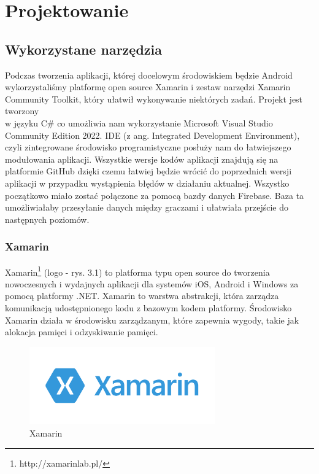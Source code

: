 	\newpage
\section{Projektowanie}		%

\subsection{Wykorzystane narzędzia}

\hspace*{0.60cm}Podczas tworzenia aplikacji, której docelowym środowiskiem będzie Android wykorzystaliśmy platformę open source Xamarin i zestaw narzędzi Xamarin Community Toolkit, który ułatwił wykonywanie niektórych zadań. Projekt jest tworzony \\w języku C\# co umożliwia nam wykorzystanie Microsoft Visual Studio Community Edition 2022. IDE (z ang. Integrated Development Environment), czyli zintegrowane środowisko programistyczne posłuży nam do łatwiejszego modułowania aplikacji. Wszystkie wersje kodów aplikacji znajdują się na platformie GitHub dzięki czemu łatwiej będzie wrócić do poprzednich wersji aplikacji w przypadku wystąpienia błędów w działaniu aktualnej. Wszystko początkowo miało zostać połączone za pomocą bazdy danych Firebase. Baza ta umożliwiałaby przesyłanie danych między graczami i ułatwiała przejście do następnych poziomów.

\subsubsection{Xamarin}

\hspace*{0.60cm}Xamarin\footnote{ http://xamarinlab.pl/} (logo - rys. 3.1) to platforma typu open source do tworzenia nowoczesnych i wydajnych aplikacji dla systemów iOS, Android i Windows za pomocą platformy .NET. Xamarin to warstwa abstrakcji, która zarządza komunikacją udostępnionego kodu z bazowym kodem platformy. Środowisko Xamarin działa w środowisku zarządzanym, które zapewnia wygody, takie jak alokacja pamięci i odzyskiwanie pamięci.

	\begin{figure}[!htb]
	\begin{center}
		\includegraphics[width=8cm]{rys/xamarin.png}
		\caption{Xamarin}
		\label{rys:rysunek001}
	\end{center}
\end{figure}

